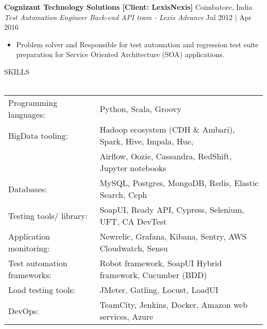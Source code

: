 \documentclass[a4paper]{article}
\newcommand{\lineunder} {
    \vspace*{-8pt} \\
    \hspace*{-18pt} \hrulefill \\
}
\newcommand{\header} [1] {
    {\hspace*{-18pt}\vspace*{6pt} \textsc{#1}}
    \vspace*{-6pt} \lineunder
}
\begin{document}
\textbf{Cognizant Technology Solutions [Client: LexisNexis]} \hfill Coimbatore, India\\
\textit{Test Automation Engineer \textbar{} Back-end API team - Lexis Advance} \hfill Jul 2012 | Apr 2016\\
\vspace{-1.5mm}
\begin{itemize} \itemsep 1pt
	\item Problem solver and Responsible for test automation and regression test suite preparation for Service Oriented Architecture (SOA) applications. 
\end{itemize}

\header{SKILLS}
\begin{tabular}{ l l}
    Programming languages:      & Python, Scala, Groovy                                    
    \\
    BigData tooling:            & Hadoop ecosystem (CDH \& Ambari), Spark, Hive, Impala, Hue,
    \\
                                & Airflow, Oozie, Cassandra, RedShift, Jupyter notebooks
    \\
    Databases:                  & MySQL, Postgres, MongoDB, Redis, Elastic Search, Ceph
    \\
	Testing tools/ library:     & SoapUI, Ready API, Cypress, Selenium, UFT, CA DevTest             \\
    Application monitoring:     & Newrelic, Grafana, Kibana, Sentry, AWS Cloudwatch, Sensu
    \\
	Test automation frameworks: & Robot framework, SoapUI Hybrid framework, Cucumber (BDD)          \\
	Load testing tools:         & JMeter, Gatling, Locust, LoadUI                                   \\
	DevOps:                     & TeamCity, Jenkins, Docker, Amazon web services, Azure \\
\end{tabular}
\vspace{2mm}

\end{document}
